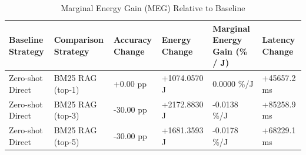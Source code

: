 \begin{table}
\caption{Marginal Energy Gain (MEG) Relative to Baseline}
\label{tab:marginal_energy_gain}
\begin{tabular}{llllll}
\toprule
Baseline Strategy & Comparison Strategy & Accuracy Change & Energy Change & Marginal Energy Gain (\% / J) & Latency Change \\
\midrule
Zero-shot Direct & BM25 RAG (top-1) & +0.00 pp & +1074.0570 J & 0.0000 \%/J & +45657.2 ms \\
Zero-shot Direct & BM25 RAG (top-3) & -30.00 pp & +2172.8830 J & -0.0138 \%/J & +85258.9 ms \\
Zero-shot Direct & BM25 RAG (top-5) & -30.00 pp & +1681.3593 J & -0.0178 \%/J & +68229.1 ms \\
\bottomrule
\end{tabular}
\end{table}
